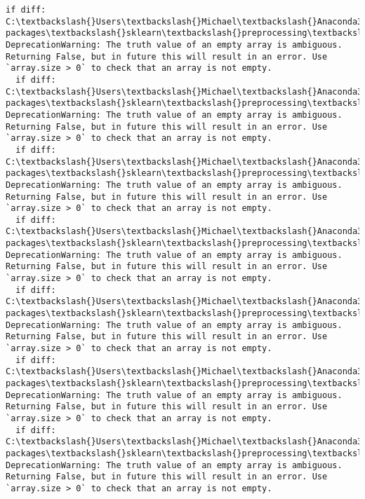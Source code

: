 \documentclass[11pt]{article}
\begin{document}
\begin{Verbatim}[commandchars=\\\{\}]
  if diff:
C:\textbackslash{}Users\textbackslash{}Michael\textbackslash{}Anaconda3.2\textbackslash{}lib\textbackslash{}site-packages\textbackslash{}sklearn\textbackslash{}preprocessing\textbackslash{}label.py:151: DeprecationWarning: The truth value of an empty array is ambiguous. Returning False, but in future this will result in an error. Use `array.size > 0` to check that an array is not empty.
  if diff:
C:\textbackslash{}Users\textbackslash{}Michael\textbackslash{}Anaconda3.2\textbackslash{}lib\textbackslash{}site-packages\textbackslash{}sklearn\textbackslash{}preprocessing\textbackslash{}label.py:151: DeprecationWarning: The truth value of an empty array is ambiguous. Returning False, but in future this will result in an error. Use `array.size > 0` to check that an array is not empty.
  if diff:
C:\textbackslash{}Users\textbackslash{}Michael\textbackslash{}Anaconda3.2\textbackslash{}lib\textbackslash{}site-packages\textbackslash{}sklearn\textbackslash{}preprocessing\textbackslash{}label.py:151: DeprecationWarning: The truth value of an empty array is ambiguous. Returning False, but in future this will result in an error. Use `array.size > 0` to check that an array is not empty.
  if diff:
C:\textbackslash{}Users\textbackslash{}Michael\textbackslash{}Anaconda3.2\textbackslash{}lib\textbackslash{}site-packages\textbackslash{}sklearn\textbackslash{}preprocessing\textbackslash{}label.py:151: DeprecationWarning: The truth value of an empty array is ambiguous. Returning False, but in future this will result in an error. Use `array.size > 0` to check that an array is not empty.
  if diff:
C:\textbackslash{}Users\textbackslash{}Michael\textbackslash{}Anaconda3.2\textbackslash{}lib\textbackslash{}site-packages\textbackslash{}sklearn\textbackslash{}preprocessing\textbackslash{}label.py:151: DeprecationWarning: The truth value of an empty array is ambiguous. Returning False, but in future this will result in an error. Use `array.size > 0` to check that an array is not empty.
  if diff:
C:\textbackslash{}Users\textbackslash{}Michael\textbackslash{}Anaconda3.2\textbackslash{}lib\textbackslash{}site-packages\textbackslash{}sklearn\textbackslash{}preprocessing\textbackslash{}label.py:151: DeprecationWarning: The truth value of an empty array is ambiguous. Returning False, but in future this will result in an error. Use `array.size > 0` to check that an array is not empty.
  if diff:
C:\textbackslash{}Users\textbackslash{}Michael\textbackslash{}Anaconda3.2\textbackslash{}lib\textbackslash{}site-packages\textbackslash{}sklearn\textbackslash{}preprocessing\textbackslash{}label.py:151: DeprecationWarning: The truth value of an empty array is ambiguous. Returning False, but in future this will result in an error. Use `array.size > 0` to check that an array is not empty.

\end{Verbatim}
\end{document}
